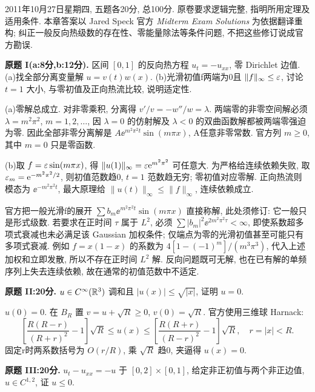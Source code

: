 2011年10月27日星期四, 五题各20分, 总100分. 原卷要求逻辑完整, 指明所用定理及适用条件. 本章答案以 Jared Speck 官方 \textit{Midterm Exam Solutions} 为依据翻译重构; 纠正一般反向热级数的存在性、零能量除法等条件问题, 不把这些修订说成官方勘误.
\begin{exercise}\label{exam:mI}
\textbf{原题 I(a:8分,b:12分).} 区间 $[0,1]$ 的反向热方程 $u_t=-u_{xx}$, 零 Dirichlet 边值. (a)找全部分离变量解 $u=v(t)w(x)$. (b)光滑初值f两端为0且 $\|f\|_\infty\le\varepsilon$, 讨论 $t=1$ 大小, 与零初值及正向热流比较, 说明适定性.
\end{exercise}
\begin{solution}
(a)零解总成立. 对非零乘积, 分离得 $v'/v=-w''/w=\lambda$. 两端零的非零空间解必须 $\lambda=m^2\pi^2$, $m=1,2,\ldots$, 因 $\lambda=0$ 的仿射解及 $\lambda<0$ 的双曲函数解都被两端零强迫为零. 因此全部非零分离解是 $A\ee^{m^2\pi^2t}\sin(m\pi x)$, A任意非零常数. 官方列 $m\ge0$, 其中 $m=0$ 只是零函数.

(b)取 $f=\varepsilon\sin(m\pi x)$, 得 $\|u(1)\|_\infty=\varepsilon\mathrm e^{m^2\pi^2}$ 可任意大. 为严格给连续依赖失败, 取 $\varepsilon_m=\mathrm e^{-m^2\pi^2/2}$, 则初值范数趋0, $t=1$ 范数趋无穷; 零初值对应零解. 正向热流则模态为 $\ee^{-m^2\pi^2t}$, 最大原理给 $\|u(t)\|_\infty\le\|f\|_\infty$, 连续依赖成立.

官方把一般光滑f的展开 $\sum b_m\ee^{m^2\pi^2t}\sin(m\pi x)$ 直接称解, 此处须修订: 它一般只是形式级数. 若要求在正时间 $\tau$ 属于 $L^2$, 必须 $\sum|b_m|^2\ee^{2m^2\pi^2\tau}<\infty$, 即使系数超多项式衰减也未必满足该 Gaussian 加权条件; 仅端点为零的光滑初值甚至可能只有多项式衰减. 例如 $f=x(1-x)$ 的系数为 $4[1-(-1)^m]/(m^3\pi^3)$, 代入上述加权和立即发散, 所以不存在正时间 $L^2$ 解. 反向问题既可无解, 也在已有解的单频序列上失去连续依赖, 故在通常的初值范数中不适定.
\end{solution}
\begin{exercise}\label{exam:mII}
\textbf{原题 II:20分.} $u\in C^\infty(\mathbb R^3)$ 调和且 $|u(x)|\le\sqrt{|x|}$, 证明 $u=0$.
\end{exercise}
\begin{solution}
$u(0)=0$. 在 $B_R$ 置 $v=u+\sqrt R\ge0$, $v(0)=\sqrt R$. 官方使用三维球 Harnack:
\[
\left[\frac{R(R-r)}{(R+r)^2}-1\right]\sqrt R\le u(x)\le
\left[\frac{R(R+r)}{(R-r)^2}-1\right]\sqrt R,
\quad r=|x|<R.
\]
固定r时两系数括号为 $O(r/R)$, 乘 $\sqrt R$ 趋0, 夹逼得 $u(x)=0$.
\end{solution}
\begin{exercise}\label{exam:mIII}
\textbf{原题 III:20分.} $u_t-u_{xx}=-u$ 于 $[0,2]\times[0,1]$, 给定非正初值与两个非正边值, $u\in C^{1,2}$, 证 $u\le0$.
\end{exercise}
